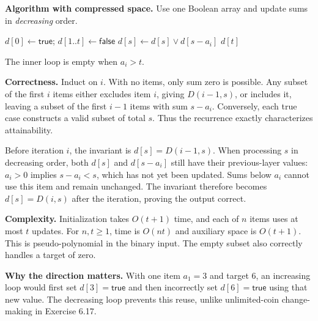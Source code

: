 \documentclass[11pt]{article}
\newcommand{\True}{\mathsf{true}}
\newcommand{\False}{\mathsf{false}}
\begin{document}
\textbf{Algorithm with compressed space.}
Use one Boolean array and update sums in \emph{decreasing} order.
\begin{algorithm}[H]
\caption{Subset sum}
\begin{algorithmic}[1]
 \State $d[0]\gets\True$; $d[1..t]\gets\False$
   \State $d[s]\gets d[s]\lor d[s-a_i]$
  \EndFor
 \EndFor
 \State \Return $d[t]$
\EndFunction
\end{algorithmic}
\end{algorithm}
The inner loop is empty when $a_i>t$.

\textbf{Correctness.}
Induct on $i$. With no items, only sum zero is possible.
Any subset of the first $i$ items either excludes item $i$, giving
$D(i-1,s)$, or includes it, leaving a subset of the first $i-1$ items
with sum $s-a_i$. Conversely, each true case constructs a valid subset
of total $s$. Thus the recurrence exactly characterizes attainability.

Before iteration $i$, the invariant is $d[s]=D(i-1,s)$.
When processing $s$ in decreasing order, both $d[s]$ and
$d[s-a_i]$ still have their previous-layer values: $a_i>0$ implies
$s-a_i<s$, which has not yet been updated. Sums below $a_i$ cannot
use this item and remain unchanged. The invariant therefore becomes
$d[s]=D(i,s)$ after the iteration, proving the output correct.

\textbf{Complexity.}
Initialization takes $O(t+1)$ time, and each of $n$ items uses at most
$t$ updates. For $n,t\ge1$, time is $\boxed{O(nt)}$ and auxiliary
space is $O(t+1)$. This is pseudo-polynomial in the binary input.
The empty subset also correctly handles a target of zero.

\textbf{Why the direction matters.}
With one item $a_1=3$ and target $6$, an increasing loop would first set
$d[3]=\True$ and then incorrectly set $d[6]=\True$ using that new value.
The decreasing loop prevents this reuse, unlike unlimited-coin
change-making in Exercise 6.17.
\end{document}

